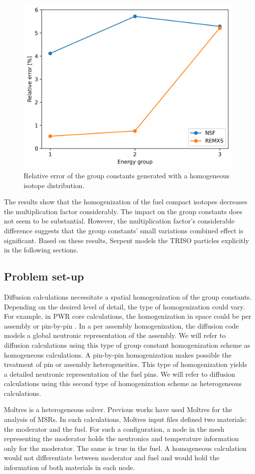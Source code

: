 \begin{figure}[htbp!]
	\centering
	\includegraphics[width=0.43\linewidth]{figures-neutronics/param-comparison}
	\hfill
	\caption{Relative error of the group constants generated with a homogeneous isotope distribution.}
	\label{fig:param-comparison}
\end{figure}

The results show that the homogenization of the fuel compact isotopes decreases the multiplication factor considerably.
The impact on the group constants does not seem to be substantial.
However, the multiplication factor's considerable difference suggests that the group constants’ small variations combined effect is significant.
Based on these results, Serpent models the TRISO particles explicitly in the following sections.


\subsection{Problem set-up}

Diffusion calculations necessitate a spatial homogenization of the group constants.
Depending on the desired level of detail, the type of homogenization could vary.
For example, in PWR core calculations, the homogenization in space could be per assembly or pin-by-pin \cite{krebs_calculational_1990}.
In a per assembly homogenization, the diffusion code models a global neutronic representation of the assembly.
We will refer to diffusion calculations using this type of group constant homogenization scheme as homogeneous calculations.
A pin-by-pin homogenization makes possible the treatment of pin or assembly heterogeneities.
This type of homogenization yields a detailed neutronic representation of the fuel pins.
We will refer to diffusion calculations using this second type of homogenization scheme as heterogeneous calculations.

Moltres is a heterogeneous solver.
Previous works \cite{lindsay_introduction_2018}\cite{pater_multiphysics_2019} have used Moltres for the analysis of \glspl{MSR}.
In such calculations, Moltres input files defined two materials: the moderator and the fuel.
For such a configuration, a node in the mesh representing the moderator holds the neutronics and temperature information only for the moderator.
The same is true in the fuel.
A homogeneous calculation would not differentiate between moderator and fuel and would hold the information of both materials in each node.

